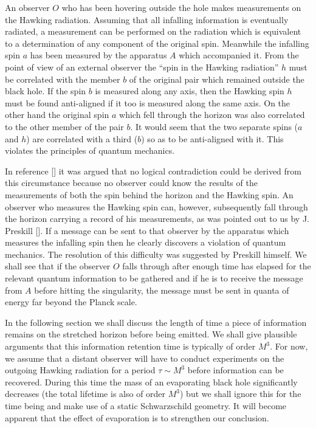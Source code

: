 An observer $O$ who has been hovering outside the hole makes
measurements on the Hawking radiation.  Assuming that all infalling
information is eventually radiated, a measurement can be performed on
the radiation which is equivalent to a determination of any component
of the original spin.  Meanwhile the infalling spin $a$ has been
measured by the apparatus $A$ which accompanied it.  From the point
of view of an external observer the ``spin in the Hawking radiation''
$h$ must be correlated with the member $b$ of the original pair which
remained outside the black hole.  If the spin $b$ is measured along
any axis, then the Hawking spin $h$ must be found anti-aligned if it
too is measured along the same axis.  On the other hand the original
spin $a$ which fell through the horizon was also correlated to the
other member of the pair $b$.  It would seem that the two separate
spins ($a$ and $h$) are correlated with a third ($b$) so as to be
anti-aligned with it.  This violates the principles of quantum
mechanics.


In reference [\stu] it was argued that no logical contradiction could
be derived from this circumstance because no observer could know the
results of the measurements of both the spin behind the horizon and
the Hawking spin.  An observer who measures the Hawking spin can,
however, subsequently fall through the horizon carrying a record of
his measurements, as was pointed out to us by J. Preskill [\johnpri].
 If a message can be sent to that observer by the apparatus which
measures the infalling spin then he clearly discovers a violation of
quantum mechanics.  The resolution of this difficulty was suggested
by Preskill himself.  We shall see that if the observer $O$ falls
through after enough time has elapsed for the relevant quantum
information to be gathered and if he is to receive the message from
$A$ before hitting the singularity, the message must be sent in
quanta of energy far beyond the Planck scale.

In the following section we shall discuss the length of time a piece
of information remains on the stretched horizon before being emitted.
 We shall give plausible arguments that this information retention
time is typically of order $M^3$.  For now, we assume that a distant
observer will have to conduct experiments on the outgoing Hawking
radiation for a period $\tau \sim M^3$ before information can be
recovered.  During this time the mass of an evaporating black hole
significantly decreases (the total lifetime is also of order $M^3$)
but we shall ignore this for the time being and make use of a static
Schwarzschild geometry.  It will become apparent that the effect of
evaporation is to strengthen our conclusion.

